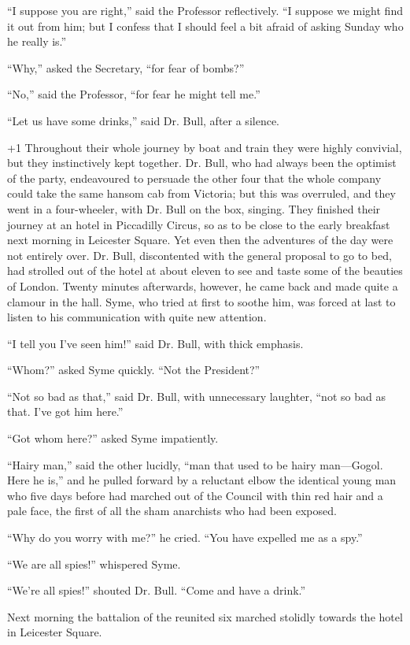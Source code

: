 “I suppose you are right,” said the Professor reflectively. “I suppose we might find it out from him; but I confess that I should feel a bit afraid of asking Sunday who he really is.”

“Why,” asked the Secretary, “for fear of bombs?”

“No,” said the Professor, “for fear he might tell me.”

“Let us have some drinks,” said Dr. Bull, after a silence.

\looseness+1
Throughout their whole journey by boat and train they were highly convivial, but they instinctively kept together. Dr. Bull, who had always been the optimist of the party, endeavoured to persuade the other four that the whole company could take the same hansom cab from Victoria; but this was overruled, and they went in a four-wheeler, with Dr. Bull on the box, singing. They finished their journey at an hotel in Piccadilly Circus, so as to be close to the early breakfast next morning in Leicester Square. Yet even then the adventures of the day were not entirely over. Dr. Bull, discontented with the general proposal to go to bed, had strolled out of the hotel at about eleven to see and taste some of the beauties of London. Twenty minutes afterwards, however, he came back and made quite a clamour in the hall. Syme, who tried at first to soothe him, was forced at last to listen to his communication with quite new attention.

“I tell you I’ve seen him!” said Dr. Bull, with thick emphasis.

“Whom?” asked Syme quickly. “Not the President?”

“Not so bad as that,” said Dr. Bull, with unnecessary laughter, “not so bad as that. I’ve got him here.”

“Got whom here?” asked Syme impatiently.

“Hairy man,” said the other lucidly, “man that used to be hairy man⁠—Gogol. Here he is,” and he pulled forward by a reluctant elbow the identical young man who five days before had marched out of the Council with thin red hair and a pale face, the first of all the sham anarchists who had been exposed.

“Why do you worry with me?” he cried. “You have expelled me as a spy.”

“We are all spies!” whispered Syme.

“We’re all spies!” shouted Dr. Bull. “Come and have a drink.”

Next morning the battalion of the reunited six marched stolidly towards the hotel in Leicester Square.

